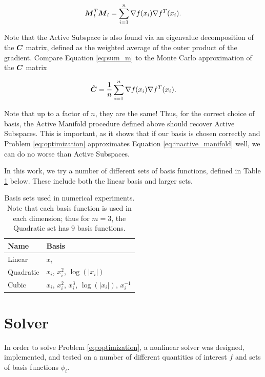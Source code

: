\documentclass[]{aiaa-tc}%
\begin{document}
\begin{equation}
\label{eq:sum_m}
\boldsymbol{M}_l^T\boldsymbol{M}_l = \sum_{i=1}^n \nabla f(x_i) \nabla f^T(x_i).
\end{equation}

Note that the Active Subspace is also found via an eigenvalue decomposition of the $\boldsymbol{C}$ matrix, defined as the weighted average of the outer product of the gradient.\cite{constantine2015} Compare Equation \ref{eq:sum_m} to the Monte Carlo approximation of the $\boldsymbol{C}$ matrix

\begin{equation}
\label{eq:sum_c}
\hat{\boldsymbol{C}} = \frac{1}{n} \sum_{i=1}^n \nabla f(x_i) \nabla f^T(x_i).
\end{equation}

Note that up to a factor of $n$, they are the same! Thus, for the correct choice of basis, the Active Manifold procedure defined above should recover Active Subspaces. This is important, as it shows that if our basis is chosen correctly and Problem \ref{eq:optimization} approximates Equation \ref{eq:inactive_manifold} well, we can do no worse than Active Subspaces.

In this work, we try a number of different sets of basis functions, defined in Table \ref{tab:basis} below. These include both the linear basis and larger sets.

\begin{table}
\centering
\begin{tabular}{ll}
\toprule
Name & Basis \\
\midrule
Linear & $x_i$ \\
Quadratic & $x_i$, $x_i^2$, $\log(|x_i|)$ \\
Cubic & $x_i$, $x_i^2$, $x_i^3$, $\log(|x_i|)$, $x_i^{-1}$ \\
\bottomrule
\end{tabular}
\caption{Basis sets used in numerical experiments. Note that each basis function is used in each dimension; thus for $m=3$, the Quadratic set has $9$ basis functions.}
\label{tab:basis}
\end{table}

\section{Solver} \label{sec:solver}
In order to solve Problem \ref{eq:optimization}, a nonlinear solver was designed, implemented, and tested on a number of different quantities of interest $f$ and sets of basis functions $\phi_i$.
\end{document}
